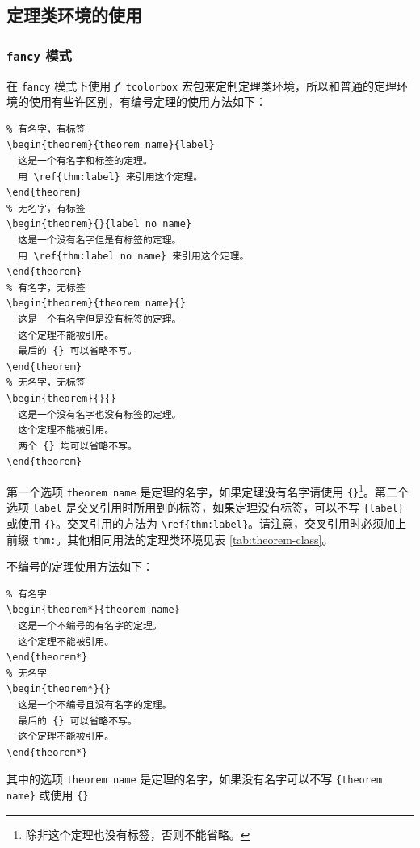 \documentclass[lang=cn,newtx,10pt,scheme=chinese]{elegantbook}
\begin{document}
\subsection{定理类环境的使用}

\subsubsection{\texttt{fancy} 模式}

在 \lstinline{fancy} 模式下使用了 \lstinline{tcolorbox} 宏包来定制定理类环境，所以和普通的定理环境的使用有些许区别，有编号定理的使用方法如下：

\begin{lstlisting}
% 有名字，有标签
\begin{theorem}{theorem name}{label}
  这是一个有名字和标签的定理。
  用 \ref{thm:label} 来引用这个定理。
\end{theorem}
% 无名字，有标签
\begin{theorem}{}{label no name}
  这是一个没有名字但是有标签的定理。
  用 \ref{thm:label no name} 来引用这个定理。
\end{theorem}
% 有名字，无标签
\begin{theorem}{theorem name}{}
  这是一个有名字但是没有标签的定理。
  这个定理不能被引用。
  最后的 {} 可以省略不写。
\end{theorem}
% 无名字，无标签
\begin{theorem}{}{}
  这是一个没有名字也没有标签的定理。
  这个定理不能被引用。
  两个 {} 均可以省略不写。
\end{theorem}
\end{lstlisting}

第一个选项 \lstinline{theorem name} 是定理的名字，如果定理没有名字请使用 \lstinline|{}|\cprotect\footnote{除非这个定理也没有标签，否则不能省略。}。第二个选项 \lstinline{label} 是交叉引用时所用到的标签，如果定理没有标签，可以不写 \lstinline|{label}| 或使用 \lstinline|{}|。交叉引用的方法为 \lstinline|\ref{thm:label}|。请注意，交叉引用时必须加上前缀 \lstinline{thm:}。其他相同用法的定理类环境见表 \ref{tab:theorem-class}。

不编号的定理使用方法如下：

\begin{lstlisting}
% 有名字
\begin{theorem*}{theorem name}
  这是一个不编号的有名字的定理。
  这个定理不能被引用。
\end{theorem*}
% 无名字
\begin{theorem*}{}
  这是一个不编号且没有名字的定理。
  最后的 {} 可以省略不写。
  这个定理不能被引用。
\end{theorem*}
\end{lstlisting}
其中的选项 \lstinline{theorem name} 是定理的名字，如果没有名字可以不写 \lstinline|{theorem name}| 或使用 \lstinline|{}|
\end{document}
